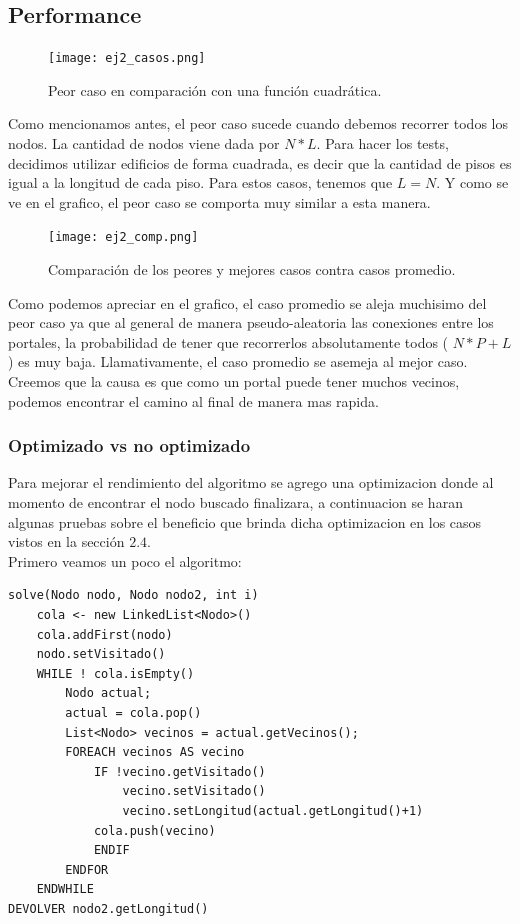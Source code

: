\subsection{Performance}

    \begin{figure}[h!]
\texttt{[image: ej2\_casos.png]}
\centering
\caption{Peor caso en comparaci\'on con una funci\'on cuadr\'atica.}
\label{overflow3}
\end{figure}
Como mencionamos antes, el peor caso sucede cuando debemos recorrer todos los nodos. La cantidad de nodos viene dada por $N*L$. Para hacer los tests, decidimos utilizar edificios de forma cuadrada, es decir que la cantidad de pisos es igual a la longitud de cada piso. Para estos casos, tenemos que $L = N$. Y como se ve en el grafico, el peor caso se comporta muy similar a esta manera. 

\begin{figure}[h!]
\texttt{[image: ej2\_comp.png]}
\centering
\caption{Comparaci\'on de los peores y mejores casos contra casos promedio.}
\label{overflow3}
\end{figure}
Como podemos apreciar en el grafico, el caso promedio se aleja muchisimo del peor caso ya que al general de manera pseudo-aleatoria las conexiones entre los portales, la probabilidad de tener que recorrerlos absolutamente todos ( $N*P+L$) es muy baja. Llamativamente, el caso promedio se asemeja al mejor caso. Creemos que la causa es que como un portal puede tener muchos vecinos, podemos encontrar el camino al final de manera mas rapida.

\subsubsection{Optimizado vs no optimizado}
Para mejorar el rendimiento del algoritmo se agrego una optimizacion donde al momento de encontrar el nodo buscado finalizara, a continuacion se haran algunas pruebas sobre el beneficio que brinda dicha optimizacion en los casos vistos en la secci\'on $2.4$.
\\
Primero veamos un poco el algoritmo:

\begin{lstlisting}
solve(Nodo nodo, Nodo nodo2, int i) 
	cola <- new LinkedList<Nodo>()
	cola.addFirst(nodo)
	nodo.setVisitado()
	WHILE ! cola.isEmpty()
        Nodo actual;
        actual = cola.pop()
        List<Nodo> vecinos = actual.getVecinos();		
        FOREACH vecinos AS vecino
            IF !vecino.getVisitado()
                vecino.setVisitado()
                vecino.setLongitud(actual.getLongitud()+1)
			cola.push(vecino)
	        ENDIF
     	ENDFOR
    ENDWHILE
DEVOLVER nodo2.getLongitud()
\end{lstlisting}

